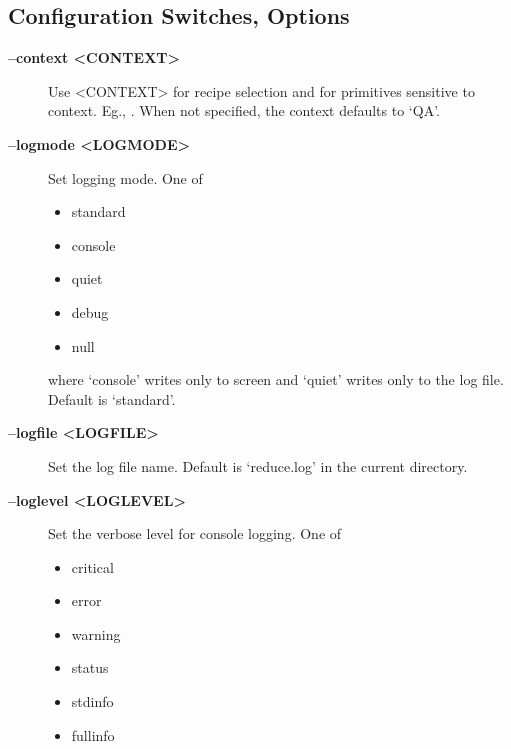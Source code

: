 \documentclass[letterpaper,10pt,english]{sphinxmanual}
\begin{document}
\subsection{Configuration Switches, Options}
\label{interfaces:configuration-switches-options}\label{interfaces:options}\begin{description}
\item[{\textbf{--context \textless{}CONTEXT\textgreater{}}}] \leavevmode
Use \textless{}CONTEXT\textgreater{} for recipe selection and for primitives sensitive to context.
Eg., . When not specified, the context defaults to `QA'.

\item[{\textbf{--logmode \textless{}LOGMODE\textgreater{}}}] \leavevmode
Set logging mode. One of
\begin{itemize}
\item {} 
standard

\item {} 
console

\item {} 
quiet

\item {} 
debug

\item {} 
null

\end{itemize}

where `console' writes only to screen and `quiet' writes only to the log
file. Default is `standard'.

\item[{\textbf{--logfile \textless{}LOGFILE\textgreater{}}}] \leavevmode
Set the log file name. Default is `reduce.log' in the current directory.

\item[{\textbf{--loglevel \textless{}LOGLEVEL\textgreater{}}}] \leavevmode
Set the verbose level for console logging. One of
\begin{itemize}
\item {} 
critical

\item {} 
error

\item {} 
warning

\item {} 
status

\item {} 
stdinfo

\item {} 
fullinfo


\end{itemize}
\end{description}
\end{document}
